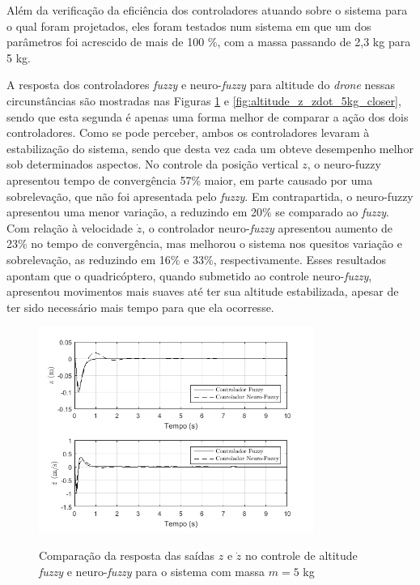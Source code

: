 Além da verificação da eficiência dos controladores atuando sobre o sistema para o qual foram projetados, eles foram testados num sistema em que um dos parâmetros foi acrescido de mais de 100 \%, com a massa passando de 2,3 kg para 5 kg.

A resposta dos controladores \textit{fuzzy} e neuro-\textit{fuzzy} para altitude do \textit{drone} nessas circunstâncias são mostradas nas Figuras \ref{fig:altitude_z_zdot_5kg} e \ref{fig:altitude_z_zdot_5kg_closer}, sendo que esta segunda é apenas uma forma melhor de comparar a ação dos dois controladores. Como se pode perceber, ambos os controladores levaram à estabilização do sistema, sendo que desta vez cada um obteve desempenho melhor sob determinados aspectos. No controle da posição vertical $z$, o neuro-fuzzy apresentou tempo de convergência 57\% maior, em parte causado por uma sobrelevação, que não foi apresentada pelo \textit{fuzzy}. Em contrapartida, o neuro-fuzzy apresentou uma menor variação, a reduzindo em 20\% se comparado ao \textit{fuzzy}. Com relação à velocidade $\dot{z}$, o controlador neuro-\textit{fuzzy} apresentou aumento de 23\% no tempo de convergência, mas melhorou o sistema nos quesitos variação e sobrelevação, as reduzindo em 16\% e 33\%, respectivamente. Esses resultados apontam que o quadricóptero, quando submetido ao controle neuro-\textit{fuzzy}, apresentou movimentos mais suaves até ter sua altitude estabilizada, apesar de ter sido necessário mais tempo para que ela ocorresse.

\begin{figure}[!htb]
    \centering
    \caption{Comparação da resposta das saídas $z$ e $\dot{z}$ no controle de altitude \textit{fuzzy} e neuro-\textit{fuzzy} para o sistema com massa $m=5$ kg}
    \includegraphics[width=0.8\textwidth]{./04-figuras/resultados/novos/altitude_z_zdot_5kg}
    \label{fig:altitude_z_zdot_5kg}
\end{figure}

